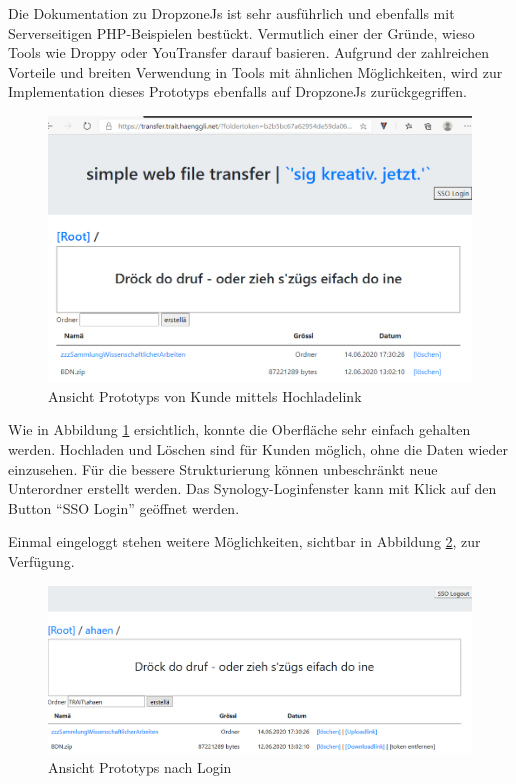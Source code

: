 Die Dokumentation \cite{DropzoneJs} zu DropzoneJs ist sehr ausführlich und ebenfalls mit Serverseitigen PHP-Beispielen bestückt. 
Vermutlich einer der Gründe, wieso Tools wie Droppy oder YouTransfer darauf basieren.
Aufgrund der zahlreichen Vorteile und breiten Verwendung in Tools mit ähnlichen Möglichkeiten,
wird zur Implementation dieses Prototyps ebenfalls auf DropzoneJs zurückgegriffen.

\begin{figure}[!h]
    \centering
    \includegraphics[width=1\linewidth]{content/images/prototyp_nichteingeloggt.png}
    \caption{Ansicht Prototyps von Kunde mittels Hochladelink}
    \label{fig:Prototyp_Hochladelink}
\end{figure} %
Wie in Abbildung \ref{fig:Prototyp_Hochladelink} ersichtlich, konnte die Oberfläche sehr einfach gehalten werden.
Hochladen und Löschen sind für Kunden möglich, ohne die Daten wieder einzusehen. Für die bessere Strukturierung können unbeschränkt neue Unterordner erstellt werden.
Das Synology-Loginfenster kann mit Klick auf den Button ``SSO Login'' geöffnet werden. \\ 
    
\clearpage  

Einmal eingeloggt stehen weitere Möglichkeiten, sichtbar in Abbildung \ref{fig:Prototyp_Migrator}, zur Verfügung. 

\begin{figure}[!h]
    \centering
    \includegraphics[width=1\linewidth]{content/images/prototyp_eingeloggt.png}
    \caption{Ansicht Prototyps nach Login}
    \label{fig:Prototyp_Migrator}
\end{figure}

